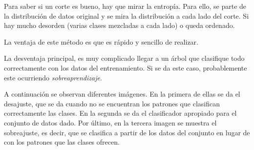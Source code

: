 \begin{figure}[ht]
	\centering
		\label{fig: Árbol binario}
\end{figure}

Para saber si un corte es bueno, hay que mirar la entropía. Para ello, se parte de la distribución de datos original y se mira la distribución a cada lado del corte. Si hay mucho desorden (varias clases mezcladas a cada lado) o queda ordenado. 

La ventaja de este método es que es rápido y sencillo de realizar.

La desventaja principal, es muy complicado llegar a un árbol que clasifique todo correctamente con los datos del entrenamiento. Si se da este caso, probablemente este ocurriendo \textit{sobreaprendizaje}.

A continuación se observan diferentes imágenes. En la primera de ellas se da el desajuste, que se da cuando no se encuentran los patrones que clasifican correctamente las clases. En la segunda se da el clasificador apropiado para el conjunto de datos dado. Por último, en la tercera imagen se muestra el sobreajuste, es decir, que se clasifica a partir de los datos del conjunto en lugar de con los patrones que las clases ofrecen.



